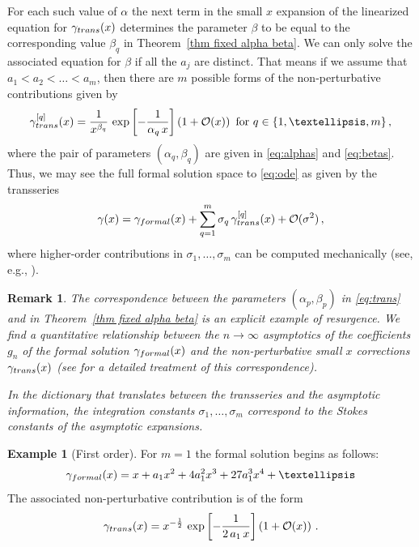 \documentclass[oneside]{amsart}
\newtheorem{remark}[thm]{Remark}
\theoremstyle{definition}
\newtheorem{example}[thm]{Example}
\newcommand{\bigO}{\mathcal{O}}
\begin{document}
For each such value of $\alpha$ the next term in the small $x$ expansion of the linearized equation for $\gamma_{\rm trans}(x)$ determines the parameter $\beta$ to be %
equal to the corresponding value $\beta_q$ in Theorem~\ref{thm fixed alpha beta}.
%
%
%
%
%
We can only solve the associated equation for $\beta$ if 
%
all the $a_j$ are distinct. That means if we assume that $a_1<a_2< \dots <a_m$, then there are $m$ possible forms of the non-perturbative contributions given by %
%
%
%
\begin{eqnarray} \label{eq:trans} \gamma_{\rm trans}^{[q]}(x) = \frac{1}{x^{\beta_q}}\, \exp\left[-\frac{1}{\alpha_q\, x}\right] \left(1+\bigO(x)\right) \text{ for } q\in \{1, \dots, m\}\,, \end{eqnarray}
where the pair of parameters $(\alpha_q, \beta_q)$ are given in \eqref{eq:alphas} and \eqref{eq:betas}.
Thus, we may see the full formal solution space to \eqref{eq:ode} as given by the transseries
$$
    \gamma(x)=\gamma_{\rm formal}(x)+\sum_{q=1}^m \sigma_q\, \gamma_{\rm trans}^{[q]}(x) + \bigO(\sigma^2)\,,
$$
where higher-order contributions in $\sigma_1,\ldots,\sigma_m$ can be computed mechanically
(see, e.g., \cite{BD,BDM,BB}).

\begin{remark}
    The correspondence between the parameters $(\alpha_p, \beta_p)$ in \eqref{eq:trans} and in Theorem~\ref{thm fixed alpha beta} is an explicit example of resurgence. We find a quantitative relationship between the $n\to \infty$ asymptotics of the coefficients $g_n$ of the formal solution $\gamma_{\rm formal}(x)$ and the non-perturbative small $x$ corrections $\gamma_{\rm trans}(x)$ (see \cite{costinDMJ} for a detailed treatment of this correspondence). 

In the dictionary that translates between the transseries and the asymptotic information,
the integration constants $\sigma_1,\ldots,\sigma_m$ correspond to the Stokes constants of the asymptotic expansions.
\end{remark}
%
%
%
%
%
%
%
%

\begin{example}[First order] 
For $m=1$ the formal solution begins as follows:
\begin{eqnarray*} \gamma_{\rm formal}(x)= x +a_1 x^2 +4a_1^2 x^3+27 a_1^3 x^4+\dots \end{eqnarray*}
The associated non-perturbative contribution is of the form
\begin{eqnarray*} \gamma_{\rm trans}(x) = x^{-\frac{1}{2}}\, \exp\left[-\frac{1}{2\,a_1\, x}\right] \left(1+\bigO(x)\right) \,. \end{eqnarray*}
\end{example}
\end{document}
